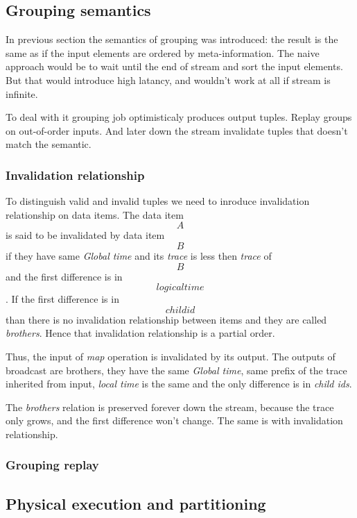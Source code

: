 
\label  {fs-implementation-section}

\subsection{Grouping semantics}
In previous section the semantics of grouping was introduced: the result is the same as if the input elements are ordered by meta-information. The naive approach would be to wait until the end of stream and sort the input elements. But that would introduce high latancy, and wouldn't work at all if stream is infinite. 

To deal with it grouping job optimisticaly produces output tuples. Replay groups on out-of-order inputs. And later down the stream invalidate tuples that doesn't match the semantic.

\subsubsection{Invalidation relationship}
To distinguish valid and invalid tuples we need to inroduce invalidation relationship on data items. The data item \[A\] is said to be invalidated by data item \[B\] if they have same {\it Global time} and its {\it trace} is less then {\it trace} of \[B\] and the first difference is in \[logical time\]. If the first difference is in \[child id\] than there is no invalidation relationship between items and they are called {\it brothers}. Hence that invalidation relationship is a partial order.

Thus, the input of {\it map} operation is invalidated by its output. The outputs of broadcast are brothers, they have the same {\it Global time}, same prefix of the trace inherited from input, {\it local time} is the same and the only difference is in {\it child ids}. 

The {\it brothers} relation is preserved forever down the stream, because the trace only grows, and the first difference won't change. The same is with invalidation relationship.

\subsubsection{Grouping replay}

\subsection{Physical execution and partitioning}

